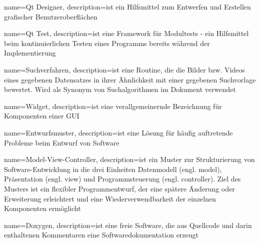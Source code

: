 {
name=Qt Designer,
description={ist ein Hilfsmittel zum Entwerfen und Erstellen grafischer Benutzeroberflächen}
}

{
name=Qt Test,
description={ist eine Framework für Modultests - ein Hilfsmittel beim kontinuierlichen Testen eines Programms bereits während der Implementierung}
}

{
name=Suchverfahren,
description={ist eine Routine, die die Bilder bzw. Videos eines gegebenen Datensatzes in ihrer Ähnlichkeit mit einer gegebenen Suchvorlage bewertet. \newline Wird als Synonym von Suchalgorithmen im Dokument verwendet}
}

{
name=Widget,
description={ist eine verallgemeinernde Bezeichnung für Komponenten einer \gls{GUI}}
}

{
name=Entwurfsmuster,
description={ist eine Lösung für häufig auftretende Probleme beim Entwurf von Software}
}

{
name=Model-View-Controller,
description={ist ein Muster zur Strukturierung von Software-Entwicklung in die drei Einheiten Datenmodell (engl. model), Präsentation (engl. view) und Programmsteuerung (engl. controller). Ziel des Musters ist ein flexibler Programmentwurf, der eine spätere Änderung oder Erweiterung erleichtert und eine Wiederverwendbarkeit der einzelnen Komponenten ermöglicht}
}

{
name=Doxygen,
description={ist eine freie Software, die aus Quellcode und darin enthaltenen Kommentaren eine Softwaredokumentation erzeugt}
}

